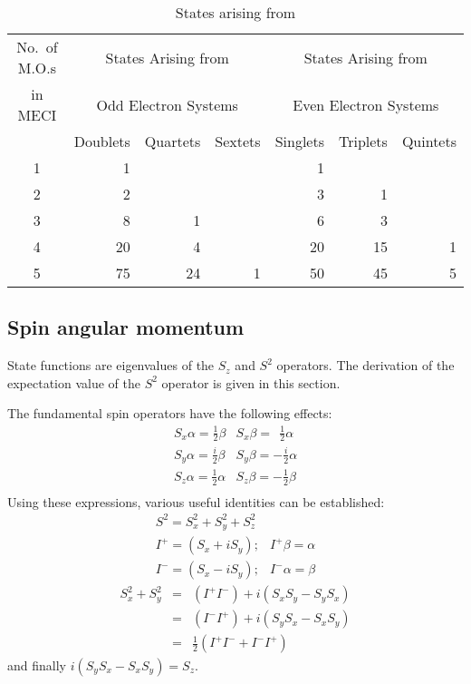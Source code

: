 \begin{table}
\caption{\label{sq} States arising from }
\begin{center}
\begin{tabular}{crrrrrr} \hline
No.\ of M.O.s & \multicolumn{3}{c}{States Arising from} &
\multicolumn{3}{c}{States Arising from}\\ in MECI &\multicolumn{3}{c}{Odd
Electron Systems}& \multicolumn{3}{c}{Even Electron Systems}\\ \hline
\index{States!arising from C.I.}
 & Doublets &Quartets&Sextets &Singlets& Triplets&Quintets
\\ \hline
1 & 1 &   & &1\\
2& 2 &   &   &3& 1\\
3& 8 & 1 & &6& 3 \\
4&20 & 4 & & 20&15 &1\\
5&75 &24 & 1& 50&  45&  5 \\ \hline
\end{tabular}
\end{center}
\end{table}

\subsection{Spin angular momentum}
State functions are eigenvalues of the $S_z$ and $S^2$ operators. The
derivation of the expectation value of the $S^2$ operator is given in this
section.

The fundamental spin operators have the following 
effects:
$$
\begin{array}{ll}
S_x\alpha = \frac{1}{2}\beta & S_x\beta =\ \  \frac{1}{2}\alpha \\
S_y\alpha = \frac{i}{2}\beta & S_y\beta = -\frac{i}{2}\alpha \\
S_z\alpha = \frac{1}{2}\alpha & S_z\beta = -\frac{1}{2}\beta \\
\end{array}
$$
Using these expressions, various useful identities can be
established:
$$
\begin{array}{ll}
S^2 = S_x^2+S_y^2+S_z^2 \\
I^+ = (S_x+iS_y);& I^+\beta = \alpha \\
I^- = (S_x-iS_y);& I^-\alpha = \beta
\end{array}
$$
\begin{eqnarray}
S_x^2+S_y^2&=&(I^+I^-)+i(S_xS_y-S_yS_x)\nonumber \\
           &=&(I^-I^+)+i(S_yS_x-S_xS_y)\nonumber \\
           &=&\frac{1}{2}(I^+I^- + I^-I^+)\nonumber
\end{eqnarray}
and finally $i(S_yS_x - S_x S_y ) = S_z$.

